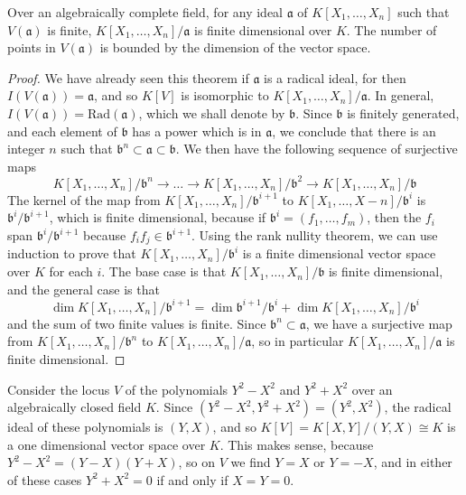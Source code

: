 \begin{lemma}
    Over an algebraically complete field, for any ideal $\mathfrak{a}$ of $K[X_1, \dots, X_n]$ such that $V(\mathfrak{a})$ is finite, $K[X_1, \dots, X_n]/\mathfrak{a}$ is finite dimensional over $K$. The number of points in $V(\mathfrak{a})$ is bounded by the dimension of the vector space.
\end{lemma}
\begin{proof}
    We have already seen this theorem if $\mathfrak{a}$ is a radical ideal, for then $I(V(\mathfrak{a})) = \mathfrak{a}$, and so $K[V]$ is isomorphic to $K[X_1, \dots, X_n]/\mathfrak{a}$. In general, $I(V(\mathfrak{a})) = \text{Rad}(\mathfrak{a})$, which we shall denote by $\mathfrak{b}$. Since $\mathfrak{b}$ is finitely generated, and each element of $\mathfrak{b}$ has a power which is in $\mathfrak{a}$, we conclude that there is an integer $n$ such that $\mathfrak{b}^n \subset \mathfrak{a} \subset \mathfrak{b}$. We then have the following sequence of surjective maps
    \[ K[X_1, \dots, X_n]/\mathfrak{b}^n \to \dots \to K[X_1, \dots, X_n]/\mathfrak{b}^2 \to K[X_1, \dots, X_n]/\mathfrak{b} \]
    The kernel of the map from $K[X_1, \dots, X_n]/\mathfrak{b}^{i+1}$ to $K[X_1, \dots, X-n]/\mathfrak{b}^i$ is $\mathfrak{b}^i/\mathfrak{b}^{i+1}$, which is finite dimensional, because if $\mathfrak{b}^i = (f_1, \dots, f_m)$, then the $f_i$ span $\mathfrak{b}^i/\mathfrak{b}^{i+1}$ because $f_if_j \in \mathfrak{b}^{i+1}$. Using the rank nullity theorem, we can use induction to prove that $K[X_1, \dots, X_n]/\mathfrak{b}^i$ is a finite dimensional vector space over $K$ for each $i$. The base case is that $K[X_1, \dots, X_n]/\mathfrak{b}$ is finite dimensional, and the general case is that
    \[ \dim K[X_1, \dots, X_n]/\mathfrak{b}^{i+1} = \dim \mathfrak{b}^{i+1}/\mathfrak{b}^i + \dim K[X_1, \dots, X_n]/\mathfrak{b}^i \]
    and the sum of two finite values is finite. Since $\mathfrak{b}^n \subset \mathfrak{a}$, we have a surjective map from $K[X_1, \dots, X_n]/\mathfrak{b}^n$ to $K[X_1, \dots, X_n]/\mathfrak{a}$, so in particular $K[X_1, \dots, X_n]/\mathfrak{a}$ is finite dimensional.
\end{proof}

\begin{example}
    Consider the locus $V$ of the polynomials $Y^2 - X^2$ and $Y^2 + X^2$ over an algebraically closed field $K$. Since $(Y^2 - X^2, Y^2 + X^2) = (Y^2,X^2)$, the radical ideal of these polynomials is $(Y,X)$, and so $K[V] = K[X,Y]/(Y,X) \cong K$ is a one dimensional vector space over $K$. This makes sense, because $Y^2 - X^2 = (Y-X)(Y+X)$, so on $V$ we find $Y = X$ or $Y = -X$, and in either of these cases $Y^2 + X^2 = 0$ if and only if $X = Y = 0$.
\end{example}

